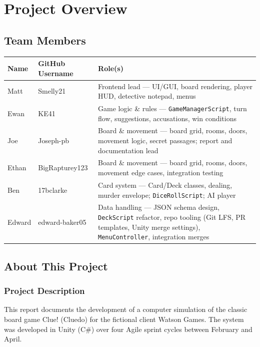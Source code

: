 \chapter{Project Overview}
\label{chap:project-overview}

\section{Team Members}

\begin{longtable}{llp{8cm}}
\toprule
\textbf{Name} & \textbf{GitHub Username} & \textbf{Role(s)} \\
\midrule
\endhead
Matt & Smelly21 & Frontend lead --- UI/GUI, board rendering, player HUD, detective notepad, menus \\
Ewan & KE41 & Game logic \& rules --- \texttt{GameManagerScript}, turn flow, suggestions, accusations, win conditions \\
Joe & Joseph-pb & Board \& movement --- board grid, rooms, doors, movement logic, secret passages; report and documentation lead \\
Ethan & BigRapturey123 & Board \& movement --- board grid, rooms, doors, movement edge cases, integration testing \\
Ben & 17bclarke & Card system --- Card/Deck classes, dealing, murder envelope; \texttt{DiceRollScript}; AI player \\
Edward & edward-baker05 & Data handling --- JSON schema design, \texttt{DeckScript} refactor, repo tooling (Git LFS, PR templates, Unity merge settings), \texttt{MenuController}, integration merges \\
\bottomrule
\end{longtable}

\section{About This Project}

\subsection{Project Description}

This report documents the development of a computer simulation of the classic board game Clue! (Cluedo) for the fictional client Watson Games. The system was developed in Unity (C\#) over four Agile sprint cycles between February and April.


